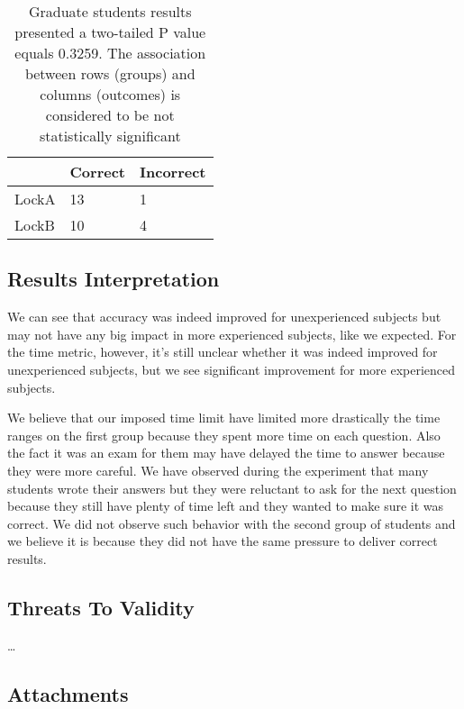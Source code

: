 \begin{table}
\begin{center}
\caption{Graduate students results presented a two-tailed P value equals 0.3259. The association between rows (groups) and columns (outcomes) is considered to be not statistically significant}
\begin{tabular}{|l|l|l|}
\hline
 & Correct & Incorrect\\
\hline
LockA & 13 & 1\\
LockB & 10 & 4\\
\hline
\end{tabular}
\end{center}
\end{table}

\subsection{Results Interpretation}

We can see that accuracy was indeed improved for unexperienced subjects but may not have any big impact in more experienced subjects, like we expected. For the time metric, however, it's still unclear whether it was indeed improved for unexperienced subjects, but we see significant improvement for more experienced subjects.

We believe that our imposed time limit have limited more drastically the time ranges on the first group because they spent more time on each question. Also the fact it was an exam for them may have delayed the time to answer because they were more careful. We have observed during the experiment that many students wrote their answers but they were reluctant to ask for the next question because they still have plenty of time left and they wanted to make sure it was correct. We did not observe such behavior with the second group of students and we believe it is because they did not have the same pressure to deliver correct results.

\subsection{Threats To Validity}

\dots

\subsection{Attachments}

